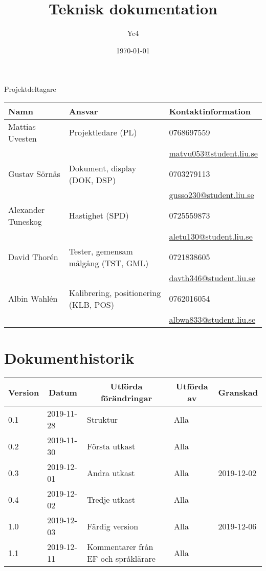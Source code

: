 \documentclass[10pt,oneside,swedish]{lips-no_customer}
\title{Teknisk dokumentation}
\author{Yc4}
\date{\today}
\begin{document}
\maketitle

\cleardoublepage
\makeprojectid

\begin{center}
  \Large Projektdeltagare
\end{center}
\begin{center}
  \begin{tabular}{|l|l|l|} \hline
    \textbf{Namn} & \textbf{Ansvar} & \textbf{Kontaktinformation }\\\hline

    Mattias Uvesten & Projektledare (PL) & 0768697559\\
    && \url{matvu053@student.liu.se} \\\hline

    Gustav Sörnäs & Dokument, display (DOK, DSP) & 0703279113\\
    && \url{gusso230@student.liu.se} \\\hline

    Alexander Tuneskog & Hastighet (SPD) & 0725559873 \\
    && \url{aletu130@student.liu.se} \\\hline

    David Thorén & Tester, gemensam målgång (TST, GML) & 0721838605 \\
    && \url{davth346@student.liu.se} \\\hline

    Albin Wahlén & Kalibrering, positionering (KLB, POS) & 0762016054 \\
    && \url{albwa833@student.liu.se} \\\hline
  \end{tabular}
\end{center}

\section*{Dokumenthistorik}
\begin{tabular}{|p{}|p{}|p{}|p{}|p{}|} 
  \hline
  \multicolumn{1}{|c}{\bfseries Version} &
  \multicolumn{1}{|c}{\bfseries Datum} &
  \multicolumn{1}{|c}{\bfseries Utförda förändringar} &
  \multicolumn{1}{|c}{\bfseries Utförda av} &
  \multicolumn{1}{|c|}{\bfseries Granskad}\\
  \hline\hline
  0.1 & 2019-11-28 & Struktur & Alla & \\\hline
  0.2 & 2019-11-30 & Första utkast & Alla & \\\hline
  0.3 & 2019-12-01 & Andra utkast & Alla & 2019-12-02 \\\hline
  0.4 & 2019-12-02 & Tredje utkast & Alla & \\\hline
  1.0 & 2019-12-03 & Färdig version & Alla & 2019-12-06 \\\hline
  1.1 & 2019-12-11 & Kommentarer från EF och språklärare & Alla & \\\hline

\end{tabular}
\end{document}
